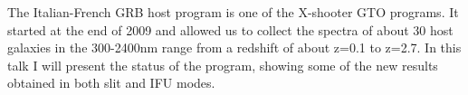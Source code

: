 


\bigskip



\bigskip

\noindent The Italian-French GRB host program is one of the X-shooter GTO programs. It started at the end of 2009 and allowed us to collect the spectra of about 30 host galaxies in the 300-2400nm range from a redshift of about z=0.1 to z=2.7. In this talk I will present the status of the program, showing some of the new results obtained in both slit and IFU modes.
